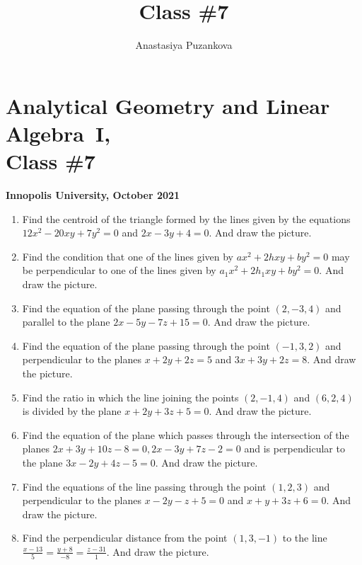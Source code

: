 \documentclass[a4paper,10pt]{article}
\title{Class \#7}
\author{Anastasiya Puzankova}
\date{}
\begin{document}
\section*{Analytical Geometry and Linear Algebra~I, \\ Class \#7}
\noindent\textbf{Innopolis University, October 2021}
\\

\begin{enumerate}

\item
Find the centroid of the triangle formed by the lines given by the equations $12x^2 - 20xy + 7y^2 = 0$ and $2x - 3y + 4 = 0$. And draw the picture.

\item %
Find the condition that one of the lines given by $ax^2 + 2hxy + by^2 = 0$ may be perpendicular to one of the lines given by $a_1x^2 + 2h_1xy + by^2 = 0$. And draw the picture.

\item %
Find the equation of the plane passing through the point $(2, -3, 4)$ and parallel to the plane $2x - 5y - 7z + 15 = 0$. And draw the picture.

\item %
Find the equation of the plane passing through the point $(-1, 3, 2)$ and perpendicular to the planes $x + 2y + 2z = 5$ and $3x + 3y + 2z = 8$. And draw the picture.

\item %
Find the ratio in which the line joining the points $(2, -1, 4)$ and $(6, 2, 4)$ is divided by the plane $x + 2y + 3z + 5 = 0$. And draw the picture.

\item %
Find the equation of the plane which passes through the intersection of the planes $2x + 3y + 10z - 8 = 0, 2x - 3y + 7z - 2 = 0$ and is perpendicular to the plane $3x - 2y + 4z - 5 = 0$. And draw the picture.

\item %
Find the equations of the line passing through the point $(1, 2, 3)$ and perpendicular to the planes $x - 2y - z + 5 = 0$ and $x + y + 3z + 6 = 0$. And draw the picture.

\item %
Find the perpendicular distance from the point $(1, 3, -1)$ to the line \\ $\frac{x-13}{5} = \frac{y+8}{-8} = \frac{z-31}{1}$. And draw the picture.


\end{enumerate}
\end{document}
